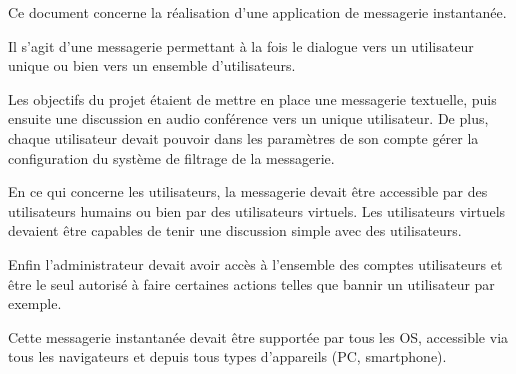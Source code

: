 	\par Ce document concerne la réalisation d'une application de messagerie instantanée.
	\par Il s’agit d’une messagerie permettant à la fois le dialogue vers un utilisateur unique ou bien vers un ensemble d’utilisateurs.
	\par Les objectifs du projet étaient de mettre en place une messagerie textuelle, puis ensuite une discussion en audio conférence vers un unique utilisateur. De plus, chaque utilisateur devait pouvoir dans les paramètres de son compte gérer la configuration du système de filtrage de la messagerie. \\

	\par En ce qui concerne les utilisateurs, la messagerie devait être accessible par des utilisateurs humains ou bien par des utilisateurs virtuels. Les utilisateurs virtuels devaient être capables de tenir une discussion simple avec des utilisateurs.
	\par Enfin l’administrateur devait avoir accès à l’ensemble des comptes utilisateurs et être le seul autorisé à faire certaines actions telles que bannir un utilisateur par exemple. \\

	\par Cette messagerie instantanée devait être supportée par tous les OS, accessible via tous les navigateurs et depuis tous types d’appareils (PC, smartphone).
